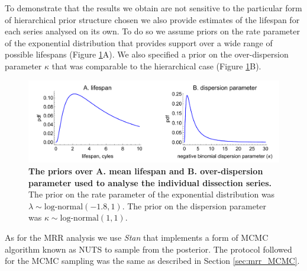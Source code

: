 \documentclass[12pt]{article}
\begin{document}
{To demonstrate that the results we obtain are not sensitive to the particular form of hierarchical prior structure chosen we also provide estimates of the lifespan for each series analysed on its own. To do so we assume priors on the rate parameter of the exponential distribution that provides support over a wide range of possible lifespans (Figure \ref{fig:dissection_lifespanPrior_individual}A). We also specified a prior on the over-dispersion parameter $\kappa$ that was comparable to the hierarchical case (Figure \ref{fig:dissection_lifespanPrior_individual}B).


\begin{figure}[ht]
	\centerline{\includegraphics[width=1\textwidth]{./Figure_files/dissection_lifespanPrior_individual.pdf}}
	\caption{\textbf{The priors over A. mean lifespan and B. over-dispersion parameter used to analyse the individual dissection series.} The prior on the rate parameter of the exponential distribution was $\lambda\sim \text{log-normal}(-1.8,1)$. The prior on the dispersion parameter was $\kappa\sim \text{log-normal}(1,1)$.}\label{fig:dissection_lifespanPrior_individual}
\end{figure}

As for the MRR analysis we use \textit{Stan} that implements a form of MCMC algorithm known as NUTS \citep{hoffman2014no} to sample from the posterior. The protocol followed for the MCMC sampling was the same as described in Section \ref{sec:mrr_MCMC}.

}
\end{document}
